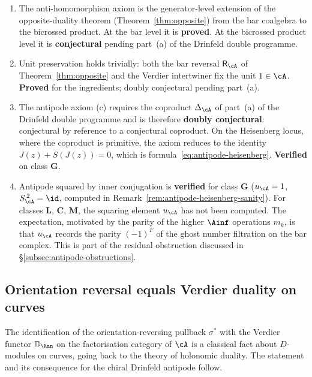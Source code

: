 \begin{remark}
\label{rem:antipode-axiom-verification}
\begin{enumerate}[label=\textup{(\alph*)}]
\item The anti-homomorphism axiom is the generator-level extension
of the opposite-duality theorem
(Theorem~\ref{thm:opposite}) from the bar coalgebra to the bicrossed
product. At the bar level it is \textbf{proved}. At the bicrossed
product level it is \textbf{conjectural} pending part~(a) of the
Drinfeld double programme.
\item Unit preservation holds trivially: both the bar reversal
$\mathsf{R}_\cA$ of Theorem~\ref{thm:opposite} and the Verdier
intertwiner fix the unit $1 \in \cA$. \textbf{Proved} for the
ingredients; doubly conjectural pending part~(a).
\item The antipode axiom (c) requires the coproduct $\Delta_\cA$ of
part~(a) of the Drinfeld double programme and is therefore
\textbf{doubly conjectural}: conjectural by reference to a
conjectural coproduct. On the Heisenberg locus, where the
coproduct is primitive, the axiom reduces to the identity
$J(z) + S(J(z)) = 0$, which is
formula~\eqref{eq:antipode-heisenberg}. \textbf{Verified}
on class $\mathbf{G}$.
\item Antipode squared by inner conjugation is \textbf{verified} for class $\mathbf{G}$
($u_\cA = 1$, $S_\cA^{\,2} = \id$, computed in
Remark~\ref{rem:antipode-heisenberg-sanity}). For classes
$\mathbf{L}$, $\mathbf{C}$, $\mathbf{M}$, the squaring element
$u_\cA$ has not been computed. The expectation, motivated by the
parity of the higher $\Ainf$ operations $m_k$, is that
$u_\cA$ records the parity $(-1)^F$ of the ghost number filtration
on the bar complex. This is part of the residual obstruction
discussed in \S\ref{subsec:antipode-obstructions}.
\end{enumerate}
\end{remark}

\subsection{Orientation reversal equals Verdier duality on curves}
\label{subsec:orientation-verdier}

The identification of the orientation-reversing pullback $\sigma^*$
with the Verdier functor $\mathbb{D}_{\Ran}$ on the factorisation
category of $\cA$ is a classical fact about $D$-modules on curves,
going back to the theory of holonomic duality. The statement and
its consequence for the chiral Drinfeld antipode follow.

